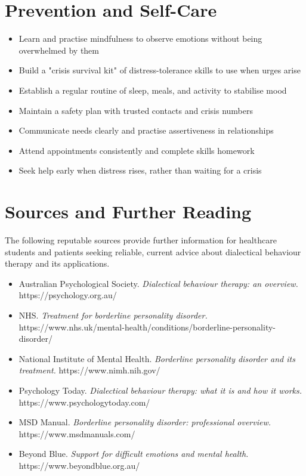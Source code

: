 \section*{Prevention and Self-Care}
\begin{itemize}
    \item Learn and practise mindfulness to observe emotions without being overwhelmed by them
    \item Build a "crisis survival kit" of distress-tolerance skills to use when urges arise
    \item Establish a regular routine of sleep, meals, and activity to stabilise mood
    \item Maintain a safety plan with trusted contacts and crisis numbers
    \item Communicate needs clearly and practise assertiveness in relationships
    \item Attend appointments consistently and complete skills homework
    \item Seek help early when distress rises, rather than waiting for a crisis
\end{itemize}

\section*{Sources and Further Reading}
The following reputable sources provide further information for healthcare students and patients seeking reliable, current advice about dialectical behaviour therapy and its applications.

\begin{itemize}
    \item Australian Psychological Society. \textit{Dialectical behaviour therapy: an overview.} https://psychology.org.au/
    \item NHS. \textit{Treatment for borderline personality disorder.} https://www.nhs.uk/mental-health/conditions/borderline-personality-disorder/
    \item National Institute of Mental Health. \textit{Borderline personality disorder and its treatment.} https://www.nimh.nih.gov/
    \item Psychology Today. \textit{Dialectical behaviour therapy: what it is and how it works.} https://www.psychologytoday.com/
    \item MSD Manual. \textit{Borderline personality disorder: professional overview.} https://www.msdmanuals.com/
    \item Beyond Blue. \textit{Support for difficult emotions and mental health.} https://www.beyondblue.org.au/
\end{itemize}
